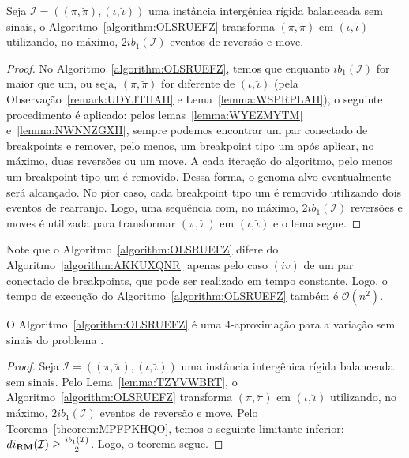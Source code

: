 \begin{lemma}\label{lemma:TZYVWBRT}
Seja $\mathcal{I} = ((\pi,\breve\pi),(\iota,\breve\iota))$ uma instância intergênica rígida balanceada sem sinais, o Algoritmo~\ref{algorithm:OLSRUEFZ} transforma $(\pi,\breve\pi)$ em $(\iota,\breve\iota)$ utilizando, no máximo, $2ib_1(\mathcal{I})$ eventos de reversão e move.
\end{lemma}
\begin{proof}
  No Algoritmo~\ref{algorithm:OLSRUEFZ}, temos que enquanto $ib_1(\mathcal{I})$ for maior que um, ou seja, $(\pi,\breve\pi)$ for diferente de $(\iota,\breve\iota)$ (pela Observação~\ref{remark:UDYJTHAH} e Lema~\ref{lemma:WSPRPLAH}), o seguinte procedimento é aplicado: pelos lemas~\ref{lemma:WYEZMYTM} e~\ref{lemma:NWNNZGXH}, sempre podemos encontrar um par conectado de breakpoints e remover, pelo menos, um breakpoint tipo um após aplicar, no máximo, duas reversões ou um move. A cada iteração do algoritmo, pelo menos um breakpoint tipo um é removido. Dessa forma, o genoma alvo eventualmente será alcançado. No pior caso, cada breakpoint tipo um é removido utilizando dois eventos de rearranjo. Logo, uma sequência com, no máximo, $2ib_1(\mathcal{I})$ reversões e moves é utilizada para transformar $(\pi,\breve\pi)$ em $(\iota,\breve\iota)$ e o lema segue.
\end{proof}

Note que o Algoritmo~\ref{algorithm:OLSRUEFZ} difere do Algoritmo~\ref{algorithm:AKKUXQNR} apenas pelo caso $(iv)$ de um par conectado de breakpoints, que pode ser realizado em tempo constante. Logo, o tempo de execução do Algoritmo~\ref{algorithm:OLSRUEFZ} também é $\mathcal{O}(n^2)$.

\begin{theorem}\label{theorem:PNTKLAHZ}
O Algoritmo~\ref{algorithm:OLSRUEFZ} é uma $4$-aproximação para a variação sem sinais do problema \SbIRM{}.
\end{theorem}
\begin{proof}
Seja $\mathcal{I} = ((\pi,\breve\pi),(\iota,\breve\iota))$ uma instância intergênica rígida balanceada sem sinais. Pelo Lema~\ref{lemma:TZYVWBRT}, o Algoritmo~\ref{algorithm:OLSRUEFZ} transforma $(\pi,\breve\pi)$ em $(\iota,\breve\iota)$ utilizando, no máximo, $2ib_1(\mathcal{I})$ eventos de reversão e move. Pelo Teorema~\ref{theorem:MPFPKHQO}, temos o seguinte limitante inferior: $di_{\textbf{RM}}(\mathcal{I}) \ge \frac{ib_1(\mathcal{I})}{2}$. Logo, o teorema segue. 
\end{proof}

